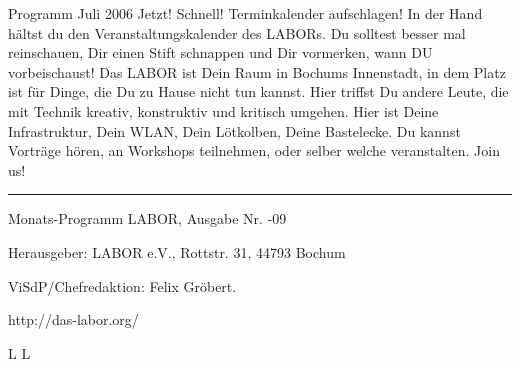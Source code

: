 Programm Juli 2006
Jetzt! Schnell! Terminkalender aufschlagen! In der Hand h\"altst du den Veranstaltungskalender des LABORs. Du solltest besser mal reinschauen, Dir einen Stift schnappen und Dir vormerken, wann DU vorbeischaust!
Das LABOR ist Dein Raum in Bochums Innenstadt, in dem Platz ist f\"ur Dinge, die Du zu Hause nicht tun kannst. Hier triffst Du andere Leute, die mit Technik kreativ, konstruktiv und kritisch umgehen. Hier ist Deine Infrastruktur, Dein WLAN, Dein L\"otkolben, Deine Bastelecke. Du kannst Vortr\"age h\"oren, an Workshops teilnehmen, oder selber welche veranstalten. Join us!

\vfill \hrule\smallskip
{\smallrm
Monats-Programm LABOR, Ausgabe Nr. {-09} \par %
Herausgeber: LABOR e.V., Rottstr. 31, 44793 Bochum \par
ViSdP/Chefredaktion: Felix Gr\"obert.\par
{\smalltt http://das-labor.org/}}

\supereject
\if L\lr \else\null\vfill\eject\fi
\if L\lr \else\null\vfill\eject\fi
\bye


